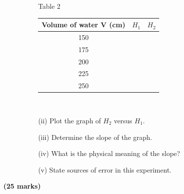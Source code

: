 \begin{enumerate}
\begin{enumerate}
\begin{enumerate}
Table 2\\[10pt]

\begin{tabular}{|p{3cm}|p{3cm}|p{3cm}|} \hline
\multicolumn{1}{|c|}{Volume of water V (cm)} & \multicolumn{1}{c|}{$H_1$} & \multicolumn{1}{c|}{$H_2$} \\ \hline
\multicolumn{1}{|c|}{150} & & \\ \hline
\multicolumn{1}{|c|}{175} & & \\ \hline
\multicolumn{1}{|c|}{200} & & \\ \hline
\multicolumn{1}{|c|}{225} & & \\ \hline
\multicolumn{1}{|c|}{250} & & \\ \hline
\end{tabular}\\[10pt]

\item[(ii)] Plot the graph of $H_2$ versus $H_1$.
\item[(iii)] Determine the slope of the graph.
\item[(iv)] What is the physical meaning of the slope?
\item[(v)] State sources of error in this experiment.
\end{enumerate}
\end{enumerate}
\end{enumerate}
\flushright \textbf{(25 marks)}

\pagebreak

